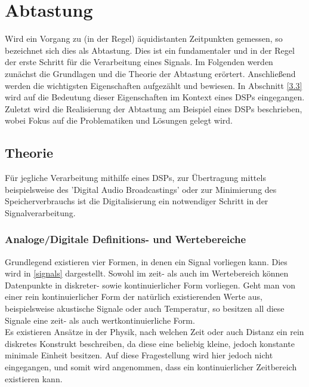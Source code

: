 \section{Abtastung}\label{3}
Wird ein Vorgang zu (in der Regel) äquidistanten Zeitpunkten gemessen, so bezeichnet sich dies als Abtastung. Dies ist ein fundamentaler und in der Regel der erste Schritt für die Verarbeitung eines Signals. Im Folgenden werden zunächst die Grundlagen und die Theorie der Abtastung erörtert. Anschließend werden die wichtigsten Eigenschaften aufgezählt und bewiesen. In Abschnitt \ref{3.3} wird auf die Bedeutung dieser Eigenschaften im Kontext eines DSPs eingegangen. Zuletzt wird die Realisierung der Abtastung am Beispiel eines DSPs beschrieben, wobei Fokus auf die Problematiken und Lösungen gelegt wird.
\subsection{Theorie}\label{3.1}
Für jegliche Verarbeitung mithilfe eines DSPs, zur Übertragung mittels beispielsweise des 'Digital Audio Broadcastings' oder zur Minimierung des Speicherverbrauchs ist die Digitalisierung ein notwendiger Schritt in der Signalverarbeitung. 

\subsubsection{Analoge/Digitale Definitions- und Wertebereiche}
Grundlegend existieren vier Formen, in denen ein Signal vorliegen kann. Dies wird in \ref{signals} dargestellt. Sowohl im zeit- als auch im Wertebereich können Datenpunkte in diskreter- sowie kontinuierlicher Form vorliegen. Geht man von einer rein kontinuierlicher Form der natürlich existierenden Werte aus, beispielsweise akustische Signale oder auch Temperatur, so besitzen all diese Signale eine zeit- als auch wertkontinuierliche Form.\\
Es existieren Ansätze in der Physik, nach welchen Zeit oder auch Distanz ein rein diskretes Konstrukt beschreiben, da diese eine beliebig kleine, jedoch konstante minimale Einheit besitzen. Auf diese Fragestellung wird hier jedoch nicht eingegangen, und somit wird angenommen, dass ein kontinuierlicher Zeitbereich existieren kann.\\
\newpage

